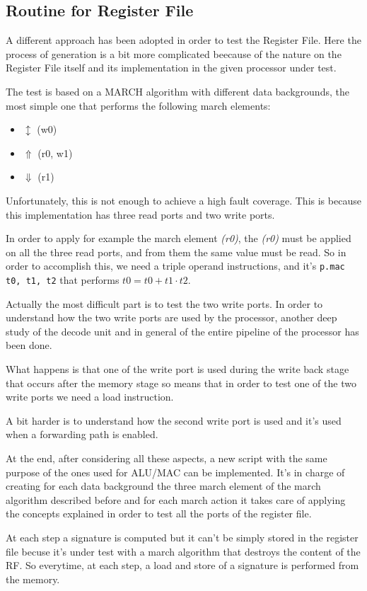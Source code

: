 \documentclass[paper=a4, fontsize=10pt]{scrartcl}	%
\begin{document}
	\subsection{Routine for Register File}
	A different approach has been adopted in order to test the Register File. Here the process of generation is a bit more complicated beecause of the nature on the Register File itself and its implementation in the given processor under test.

	The test is based on a MARCH algorithm with different data backgrounds, the most simple one that performs the following march elements:

	\begin{itemize}
		\itemsep0sp
		\item $\updownarrow$ (w0)
		\item $\Uparrow$ (r0, w1)
		\item $\Downarrow$ (r1)
	\end{itemize}

	Unfortunately, this is not enough to achieve a high fault coverage. This is because this implementation has three read ports and two write ports. 
	
	In order to apply for example the march element \textit{(r0)}, the \textit{(r0)} must be applied on all the three read ports, and from them the same value must be read. So in order to accomplish this, we need a triple operand instructions, and it's \texttt{p.mac t0, t1, t2} that performs $t0 = t0 + t1 \cdot t2$.\newline

	Actually the most difficult part is to test the two write ports. In order to understand how the two write ports are used by the processor, another deep study of the decode unit and in general of the entire pipeline of the processor has been done. 
	
	What happens is that one of the write port is used during the write back stage that occurs after the memory stage so means that in order to test one of the two write ports we need a load instruction. 

	A bit harder is to understand how the second write port is used and it's used when a forwarding path is enabled. \newline

	At the end, after considering all these aspects, a new script with the same purpose of the ones used for ALU/MAC can be implemented. It's in charge of creating for each data background the three march element of the march algorithm described before and for each march action it takes care of applying the concepts explained in order to test all the ports of the register file. \newline

	At each step a signature is computed but it can't be simply stored in the register file becuse it's under test with a march algorithm that destroys the content of the RF. So everytime, at each step, a load and store of a signature is performed from the memory.
\end{document}
